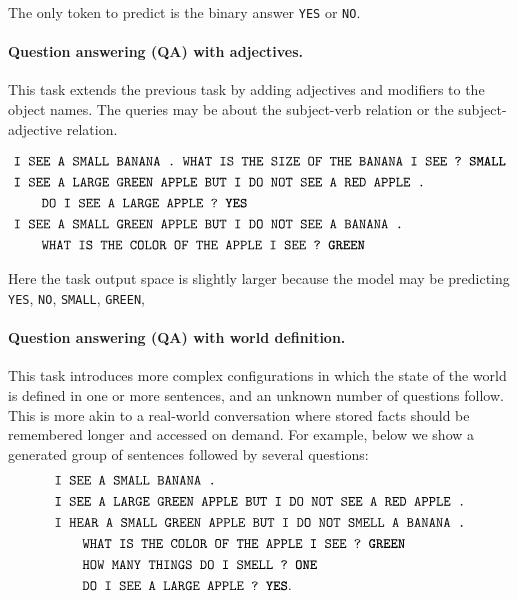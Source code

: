 The only token to predict is the binary answer \texttt{YES} or \texttt{NO}.

\paragraph{Question answering (QA) with adjectives.}

This task extends the previous task by adding adjectives and modifiers to the
object names. The queries may be about the subject-verb relation or the
subject-adjective relation.

\begin{align*}
  &\texttt{I SEE A SMALL BANANA .}\texttt{ WHAT IS THE SIZE OF THE BANANA I SEE ? } \texttt{\textbf{SMALL}}\\
  &  \texttt{I SEE A LARGE GREEN APPLE BUT I DO NOT SEE A RED APPLE .} \\
  & \quad\quad\texttt{DO I SEE A LARGE APPLE ? \textbf{YES}} \\
  &  \texttt{I SEE A SMALL GREEN APPLE BUT I DO NOT SEE A BANANA .}\\
  &\quad\quad\texttt{WHAT IS THE COLOR OF THE APPLE I SEE ? \textbf{GREEN}}
\end{align*}

Here the task output space is slightly larger because the model may be
predicting \texttt{YES}, \texttt{NO}, \texttt{SMALL}, \texttt{GREEN}, \etc

\paragraph{Question answering (QA) with world definition.}

This task introduces more complex configurations in which the state of the world is
defined in one or more sentences, and an unknown number of questions follow.
This is more akin to a real-world conversation where stored facts should be
remembered longer and accessed on demand.
For example, below we show a generated group of sentences followed by several questions:
\begin{align*}
  &\texttt{I SEE A SMALL BANANA .}\\
  &  \texttt{I SEE A LARGE GREEN APPLE BUT I DO NOT SEE A RED APPLE .} \\
  &  \texttt{I HEAR A SMALL GREEN APPLE BUT I DO NOT SMELL A BANANA .}\\
  &\quad\quad\texttt{WHAT IS THE COLOR OF THE APPLE I SEE ? \textbf{GREEN}}\\
  &\quad\quad\texttt{HOW MANY THINGS DO I SMELL ? \textbf{ONE}}\\
  & \quad\quad\texttt{DO I SEE A LARGE APPLE ? \textbf{YES}}. \\
\end{align*}

